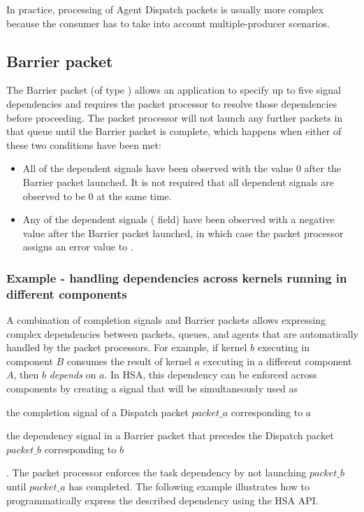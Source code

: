 \documentclass[final,oneside]{book}
\begin{document}
In practice, processing of Agent Dispatch packets is usually more
complex because the consumer has to take into account multiple-producer
scenarios.

\subsection{Barrier packet}\label{barrier-packet}

The Barrier packet (of type ) allows an application
to specify up to five signal dependencies and requires the packet processor to
resolve those dependencies before proceeding.  The packet processor will not
launch any further packets in that queue until the Barrier packet is complete,
which happens when either of these two conditions have been met:
\begin{itemize}[itemsep=1pt,topsep=3pt,partopsep=0pt]
\item All of the dependent signals have been observed with the value 0 after the
  Barrier packet launched. It is not required that all dependent signals are
  observed to be 0 at the same time.
\item Any of the dependent signals (
  field) have been observed with a negative value after the Barrier packet
  launched, in which case the packet processor assigns an error value to
  .
\end{itemize}

\subsubsection{Example - handling dependencies across kernels running in
  different components}
A combination of completion signals and Barrier packets allows expressing
complex dependencies between packets, queues, and agents that are automatically
handled by the packet processors. For example, if kernel $b$ executing in
component $B$ consumes the result of kernel $a$ executing in a different
component $A$, then $b$ \textit{depends} on $a$. In HSA, this dependency can be
enforced across components by creating a signal that will be simultaneously used
as \begin{inparaenum}[I\upshape)] \item the completion signal of a Dispatch
  packet $packet\_a$ corresponding to $a$ \item the dependency signal in a
  Barrier packet that precedes the Dispatch packet $packet\_b$ corresponding to
  $b$\end{inparaenum}. The packet processor enforces the task dependency by not
launching $packet\_b$ until $packet\_a$ has completed. The following example
illustrates how to programmatically express the described dependency using the
HSA API.

\end{document}
